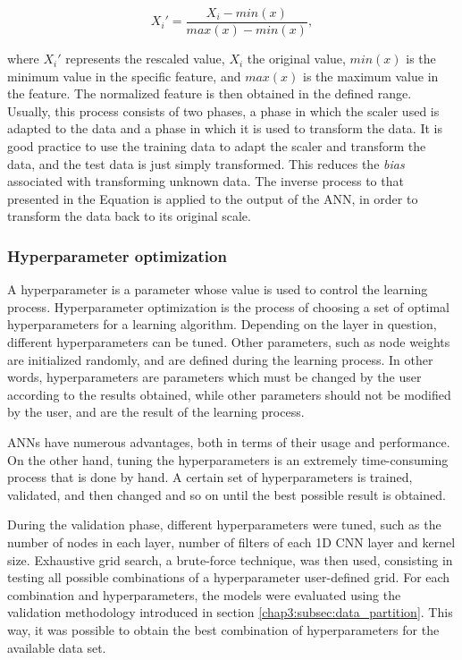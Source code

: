 \begin{equation}
     X_i' = \frac{X_i - min(x) }{max(x)-min(x)},
\label{minmax}
\end{equation}

where $X_i'$ represents the rescaled value, $X_i$ the original value, $min(x)$ is the minimum value in the specific feature, and $max(x)$ is the maximum value in the feature. The normalized feature is then obtained in the defined range. Usually, this process consists of two phases, a phase in which the scaler used is adapted to the data and a phase in which it is used to transform the data. It is good practice to use the training data to adapt the scaler and transform the data, and the test data is just simply transformed. This reduces the \textit{bias} associated with transforming unknown data. The inverse process to that presented in the Equation \cite{minmax} is applied to the output of the \ac{ANN}, in order to transform the data back to its original scale.


\subsubsection{Hyperparameter optimization} \label{chap3:subsubsec:hyperparameter_optimization}

A hyperparameter is a parameter whose value is used to control the learning process. Hyperparameter optimization is the process of choosing a set of optimal hyperparameters for a learning algorithm. Depending on the layer in question, different hyperparameters can be tuned. Other parameters, such as node weights are initialized randomly, and are defined during the learning process. In other words, hyperparameters are parameters which must be changed by the user according to the results obtained, while other parameters should not be modified by the user, and are the result of the learning process.

\ac{ANN}s have numerous advantages, both in terms of their usage and performance. On the other hand, tuning the hyperparameters is an extremely time-consuming process that is done by hand. A certain set of hyperparameters is trained, validated, and then changed and so on until the best possible result is obtained. 

During the validation phase, different hyperparameters were tuned, such as the number of nodes in each layer, number of filters of each \ac{1D CNN} layer and kernel size. Exhaustive grid search, a brute-force technique, was then used, consisting in testing all possible combinations of a hyperparameter user-defined grid. For each combination and hyperparameters, the models were evaluated using the validation methodology introduced in section \ref{chap3:subsec:data_partition}. This way, it was possible to obtain the best combination of hyperparameters for the available data set.

